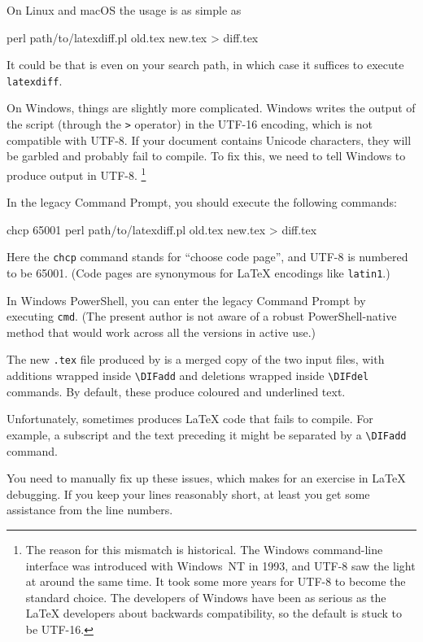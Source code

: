 On Linux and macOS the usage is as simple as
\begin{ExampleCode}
perl path/to/latexdiff.pl old.tex new.tex > diff.tex
\end{ExampleCode}
It could be that  is even on your search path,
in which case it suffices to execute \verb|latexdiff|.

On Windows, things are slightly more complicated.
Windows writes the output of the script (through the \verb|>| operator)
in the UTF-16 encoding, which is not compatible with UTF-8.
If your document contains Unicode characters,
they will be garbled and probably fail to compile.
To fix this, we need to tell Windows to produce output in UTF-8.%
\footnote{The reason for this mismatch is historical.
The Windows command-line interface was introduced with Windows~NT in 1993,
and UTF-8 saw the light at around the same time.
It took some more years for UTF-8 to become the standard choice.
The developers of Windows have been as serious as the \LaTeX{} developers about backwards compatibility,
so the default is stuck to be UTF-16.}

In the legacy Command Prompt, you should execute the following commands:
\begin{ExampleCode}
chcp 65001
perl path/to/latexdiff.pl old.tex new.tex > diff.tex
\end{ExampleCode}
Here the \verb|chcp| command stands for ``choose code page'',
and UTF-8 is numbered to be 65001.
(Code pages are synonymous for \LaTeX{} encodings like \verb|latin1|.)

In Windows PowerShell, you can enter the legacy Command Prompt by executing \verb|cmd|.
(The present author is not aware of a robust PowerShell-native method that would work across
all the versions in active use.)

The new \verb|.tex| file produced by 
is a merged copy of the two input files,
with additions wrapped inside \verb|\DIFadd|
and deletions wrapped inside \verb|\DIFdel| commands.
By default, these produce coloured and underlined text.

\begin{gotcha}
Unfortunately,  sometimes produces \LaTeX{} code that fails to compile.
For example, a subscript and the text preceding it might be separated by a \verb|\DIFadd| command.

You need to manually fix up these issues,
which makes for an exercise in \LaTeX{} debugging.
If you keep your lines reasonably short,
at least you get some assistance from the line numbers.
\end{gotcha}

